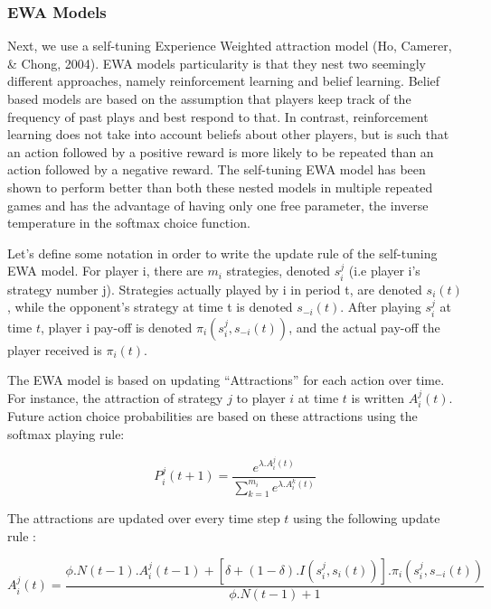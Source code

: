 \documentclass[man,floatsintext]{apa6}
\begin{document}
\hypertarget{ewa-models}{%
\subsubsection{EWA Models}\label{ewa-models}}

Next, we use a self-tuning Experience Weighted attraction model (Ho, Camerer, \& Chong, 2004). EWA models particularity is that they nest two seemingly different approaches, namely reinforcement learning and belief learning. Belief based models are based on the assumption that players keep track of the frequency of past plays and best respond to that. In contrast, reinforcement learning does not take into account beliefs about other players, but is such that an action followed by a positive reward is more likely to be repeated than an action followed by a negative reward. The self-tuning EWA model has been shown to perform better than both these nested models in multiple repeated games and has the advantage of having only one free parameter, the inverse temperature in the softmax choice function.

Let's define some notation in order to write the update rule of the self-tuning EWA model. For player i, there are \(m_{i}\) strategies, denoted \(s_{i}^{j}\) (i.e player i's strategy number j). Strategies actually played by i in period t, are denoted \(s_{i}(t)\), while the opponent's strategy at time t is denoted \(s_{-i}(t)\). After playing \(s_{i}^{j}\) at time \(t\), player i pay-off is denoted \(\pi_{i}(s_{i}^{j},s_{-i}(t))\), and the actual pay-off the player received is \(\pi_{i}(t)\).

The EWA model is based on updating \enquote{Attractions} for each action over time. For instance, the attraction of strategy \(j\) to player \(i\) at time \(t\) is written \(A_{i}^{j}(t)\). Future action choice probabilities are based on these attractions using the softmax playing rule:

\[P_{i}^{j}(t+1) = \frac{e^{\lambda . A_{i}^{j}(t)}}{\sum_{k=1}^{m_{i}}e^{\lambda . A_{i}^{k}(t)}} \]

The attractions are updated over every time step \(t\) using the following update rule :

\[ A_{i}^{j}(t) =  \frac{\phi . N(t-1) . A_{i}^{j}(t-1) + [ \delta + (1-\delta) . I(s_{i}^{j},s_{i}(t))] . \pi_{i}(s_{i}^{j},s_{-i}(t)) } {\phi . N(t-1) + 1} \]
\end{document}
